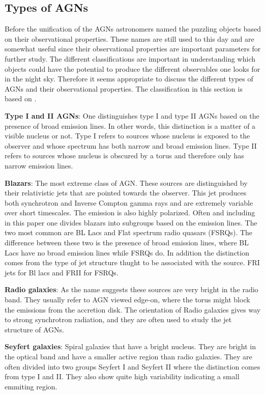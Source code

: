 \documentclass{article}
\begin{document}
\subsection{Types of AGNs}

Before the unification of the AGNs astronomers named the puzzling objects based on their observational properties. These 
names are still used to this day and are somewhat useful since their observational properties are important parameters for further study. 
The different classifications are important in understanding which objects could have the potential to produce the different observables one 
looks for in the night sky. Therefore it seems appropriate to
discuss the different types of AGNs and their observational properties. The classification in this section is based on \cite{Astrobites}.

\textbf{Type I and II AGNs}:
One distinguishes type I and type II AGNs based on the presence of broad emission lines. In other words, this distinction is
a matter of a visible nucleus or not. Type I refers to sources whose nucleus is exposed to the observer and whose spectrum
has both narrow and broad emission lines. Type II refers to sources whose nucleus is obscured by a torus and therefore only has narrow emission lines.

\textbf{Blazars}:
The most extreme class of AGN. These sources are distinguished by their relativistic jets that are pointed towards the observer. 
This jet produces both synchrotron and Inverse Compton gamma rays and are extremely variable over short timescales. The
emission is also highly polarized. Often and including in this paper one divides blazars into subgroups based on the 
emission lines. The two most common are BL Lacs and Flat spectrum radio quasars (FSRQs). The difference between these two is the
presence of broad emission lines, where BL Lacs have no broad emission lines while FSRQs do. 
In addition the distinction comes from the type of jet structure thught to be associated with the source. FRI jets for Bl lacs and FRII for FSRQs. 

\textbf{Radio galaxies}:
As the name suggests these sources are very bright in the radio band. They usually refer to AGN viewed edge-on, where the
torus might block the emissions from the accretion disk. The orientation of Radio galaxies gives way to strong 
synchrotron radiation, and they are often used to study the jet structure of AGNs.

\textbf{Seyfert galaxies}:
Spiral galaxies that have a bright nucleus. They are bright in the optical band and have a smaller active region 
than radio galaxies. They are often divided into two groups Seyfert I and Seyfert II where the distinction comes from type I and II. 
They also show quite high variability indicating a small emmiting region. 
\end{document}
